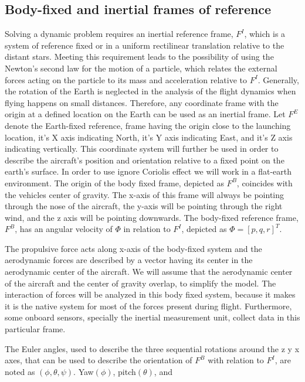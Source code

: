 \documentclass[twocolumn,showpacs,
    nofootinbib,aps,superscriptaddress,
    eqsecnum,prd,showkeys,10pt,floatfix]{revtex4}
\begin{document}
\subsection{Body-fixed and inertial frames of reference}
Solving a dynamic problem requires an inertial reference frame, $F^I$, which is
a system of reference fixed or in a uniform rectilinear translation relative to
the distant stars. Meeting this requirement leads to the possibility of using
the Newton's second law for the motion of a particle, which relates the
external forces acting on the particle to its mass and acceleration relative to
$F^I$. Generally, the rotation of the Earth is neglected in the analysis of the
flight dynamics when flying happens on small distances. Therefore, any
coordinate frame with the origin at a defined location on the Earth can be used
as an inertial frame. Let $F^E$ denote the Earth-fixed reference, frame having
the origin close to the launching location, it's X axis indicating North, it's
Y axis indicating East, and it's Z axis indicating vertically. This coordinate
system will further be used in order to describe the aircraft's position and
orientation relative to a fixed point on the earth's surface. In order to use
ignore Coriolis effect we will work in a flat-earth environment. The origin of
the body fixed frame, depicted as $F^B$, coincides with the vehicles center of
gravity. The x-axis of this frame will always be pointing through the nose of
the aircraft, the y-axis will be pointing through the right wind, and the z
axis will be pointing downwards. The body-fixed reference frame, $F^B$, has an
angular velocity of $\varPhi$ in relation to $F^I$, depicted as
$\varPhi={[p,q,r]}^T$.
\par
The propulsive force acts along x-axis of the body-fixed system and the
aerodynamic forces are described by a vector having its center in the
aerodynamic center of the aircraft. We will assume that the aerodynamic center
of the aircraft and the center of gravity overlap, to simplify the model. The
interaction of forces will be analyzed in this body fixed system, because it
makes it is the native system for most of the forces present during flight.
Furthermore, some onboard sensors, specially the inertial measurement unit,
collect data in this particular frame.
\par
The Euler angles, used to describe the three sequential rotations around the z
y x axes, that can be used to describe the orientation of $F^B$ with relation
to $F^I$, are noted as $(\phi,\theta,\psi)$. Yaw$(\phi)$, pitch$(\theta)$, and
\end{document}
